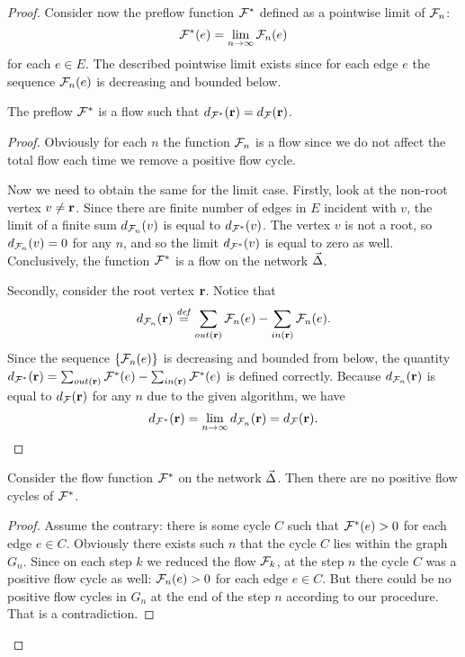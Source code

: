 \documentclass[12pt]{amsart}
\begin{document}
\begin{proof}
      Consider now the preflow function $\mathcal{F^{*}}$ defined as a pointwise limit of $\mathcal{F}_{n}$:
      \[
        \mathcal{F^{*}}(e) = \lim_{n \to \infty} \mathcal{F}_{n}(e)
      \]
        for each $e \in E$.
      The described pointwise limit exists since for each edge $e$ the sequence $\mathcal{F}_{n}(e)$ is decreasing and bounded below.
      \begin{prop}
        The preflow $\mathcal{F^{*}}$ is a flow such that $d_{\mathcal{F^{*}}}(\mathbf{r}) = d_{\mathcal{F}}(\mathbf{r})$.
      \end{prop}
      \begin{proof}
        Obviously for each $n$ the function $\mathcal{F}_{n}$ is a flow since we do not affect the total flow each time we remove a positive flow cycle.

        Now we need to obtain the same for the limit case.
        Firstly, look at the non-root vertex $v \neq \mathbf{r}$.
        Since there are finite number of edges in $E$ incident with $v$, the limit of
          a finite sum $d_{\mathcal{F}_{n}}(v)$ is equal to $d_{\mathcal{F^{*}}}(v)$.
        The vertex $v$ is not a root, so $d_{\mathcal{F}_{n}}(v) = 0$ for any $n$, and so the limit $d_{\mathcal{F^{*}}}(v)$ is equal to zero as well.
        Conclusively, the function $\mathcal{F^{*}}$ is a flow on the network $\vec{\Delta}$.

        Secondly, consider the root vertex $\mathbf{r}$.
        Notice that
        \[
          d_{\mathcal{F}_{n}}(\mathbf{r}) \overset{\mathit{def}}{=} \sum_{out(\mathbf{r})} \mathcal{F}_{n}(e) - \sum_{in(\mathbf{r})} \mathcal{F}_{n}(e).
        \]
        Since the sequence $\{\mathcal{F}_{n}(e)\}$ is decreasing and bounded from below,
          the quantity $d_{\mathcal{F^{*}}}(\mathbf{r})=\sum_{out(\mathbf{r})} \mathcal{F^{*}}(e) - \sum_{in(\mathbf{r})} \mathcal{F^{*}}(e)$ is defined correctly.
        Because $d_{\mathcal{F}_{n}}(\mathbf{r})$ is equal to $d_{\mathcal{F}}(\mathbf{r})$ for any $n$ due to the given algorithm, we have
        \[
          d_{\mathcal{F^{*}}}(\mathbf{r}) = \lim_{n \to \infty} d_{\mathcal{F}_{n}}(\mathbf{r}) = d_{\mathcal{F}}(\mathbf{r}).
        \]
      \end{proof}
      \begin{prop}
        Consider the flow function $\mathcal{F^{*}}$ on the network $\vec{\Delta}$.
        Then there are no positive flow cycles of $\mathcal{F^{*}}$.
      \end{prop}
      \begin{proof}
        Assume the contrary: there is some cycle $C$ such that $\mathcal{F^{*}}(e) > 0$ for
          each edge $e \in C$.
        Obviously there exists such $n$ that the cycle $C$ lies within the graph $G_n$.
        Since on each step $k$ we reduced the flow $\mathcal{F}_{k}$, at the step $n$
          the cycle $C$ was a positive flow cycle as well: $\mathcal{F}_{n}(e) > 0$ for each edge $e \in C$.
        But there could be no positive flow cycles in $G_n$ at the end of the step $n$ according to our procedure.
        That is a contradiction.
      \end{proof}


\end{proof}
\end{document}
